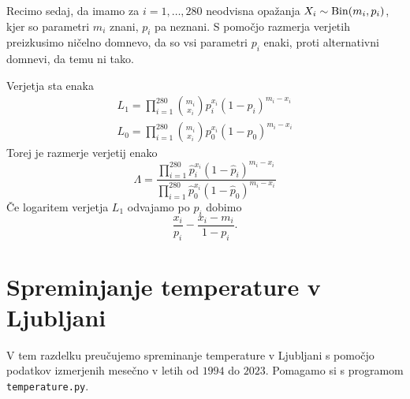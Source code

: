 \documentclass[12pt, a4paper]{article}
\begin{document}

Recimo sedaj, da imamo za $i = 1, \dots, 280$ neodvisna opažanja
$X_i \sim \operatorname{Bin}(m_i, p_i)$, kjer so parametri $m_i$ znani, 
$p_i$ pa neznani. S pomočjo razmerja verjetih preizkusimo 
ničelno domnevo, da so vsi parametri $p_i$ enaki, proti 
alternativni domnevi, da temu ni tako.

Verjetja sta enaka
\begin{align*}
    L_1 = \prod_{i=1}^{280} \binom{m_i}{x_i}p_i^{x_i}(1-p_i)^{m_i-x_i} \\
    L_0 = \prod_{i=1}^{280} \binom{m_i}{x_i}p_0^{x_i}(1-p_0)^{m_i-x_i}   
\end{align*}
Torej je razmerje verjetij enako
\[
    \Lambda =
    \frac{\prod_{i=1}^{280} \hat p_i^{x_i}(1-\hat p_i)^{m_i-x_i}}
    {\prod_{i=1}^{280} \hat p_0^{x_i}(1-\hat p_0)^{m_i-x_i}}
\]
Če logaritem verjetja $L_1$ odvajamo po $p_i$ 
dobimo
\[
    \frac{x_i}{p_i} - \frac{x_i-m_i}{1-p_i}.
\]




\newpage

\section{Spreminjanje temperature v Ljubljani}

V tem razdelku preučujemo spreminanje temperature v Ljubljani s 
pomočjo podatkov izmerjenih mesečno v letih od $1994$ do $2023$.
Pomagamo si s programom \texttt{temperature.py}.
\end{document}
